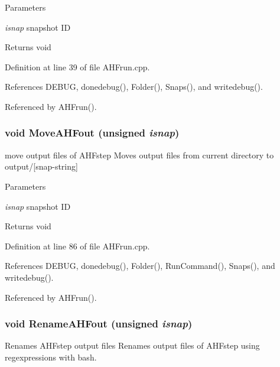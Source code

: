 \begin{DoxyParams}{Parameters}
\item[{\em isnap}]snapshot ID \end{DoxyParams}
\begin{DoxyReturn}{Returns}
void 
\end{DoxyReturn}


Definition at line 39 of file AHFrun.cpp.



References DEBUG, donedebug(), Folder(), Snaps(), and writedebug().



Referenced by AHFrun().

\subsubsection[{MoveAHFout}]{\setlength{\rightskip}{0pt plus 5cm}void MoveAHFout (unsigned {\em isnap})}\label{AHFrun_8cpp_a0c1b81f14fbaf2f91b492b88c22048f2}


move output files of AHFstep Moves output files from current directory to output/\mbox{[}snap-\/string\mbox{]} 


\begin{DoxyParams}{Parameters}
\item[{\em isnap}]snapshot ID \end{DoxyParams}
\begin{DoxyReturn}{Returns}
void 
\end{DoxyReturn}


Definition at line 86 of file AHFrun.cpp.



References DEBUG, donedebug(), Folder(), RunCommand(), Snaps(), and writedebug().



Referenced by AHFrun().

\subsubsection[{RenameAHFout}]{\setlength{\rightskip}{0pt plus 5cm}void RenameAHFout (unsigned {\em isnap})}\label{AHFrun_8cpp_aa08053728ff6ed1133954df327e4fb7a}


Renames AHFstep output files Renames output files of AHFstep using regexpressions with bash. 


